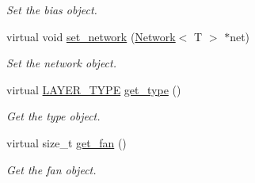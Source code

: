 \begin{DoxyCompactItemize}
\begin{DoxyCompactList}\small\item\em Set the bias object. \end{DoxyCompactList}\item 
virtual void \mbox{\hyperlink{class_layer_a6281daa82294d6979eaa59acf0ea8f31}{set\+\_\+network}} (\mbox{\hyperlink{class_network}{Network}}$<$ T $>$ $\ast$net)
\begin{DoxyCompactList}\small\item\em Set the network object. \end{DoxyCompactList}\item 
virtual \mbox{\hyperlink{layer__base_8hpp_a5f7e99058765b058df158c099200b154}{L\+A\+Y\+E\+R\+\_\+\+T\+Y\+PE}} \mbox{\hyperlink{class_layer_a9a59bb1bd6e1880abc71d9afbfb96496}{get\+\_\+type}} ()
\begin{DoxyCompactList}\small\item\em Get the type object. \end{DoxyCompactList}\item 
virtual size\+\_\+t \mbox{\hyperlink{class_layer_a43681206a2ef690667c41423b6b6f20b}{get\+\_\+fan}} ()
\begin{DoxyCompactList}\small\item\em Get the fan object. \end{DoxyCompactList}\end{DoxyCompactItemize}
